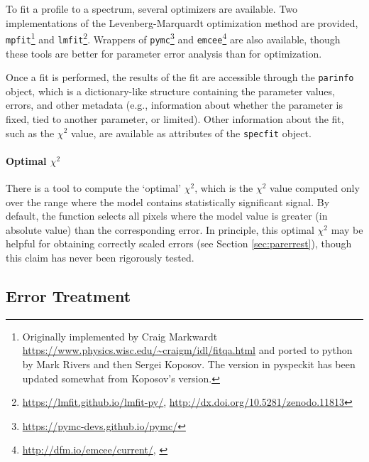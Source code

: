 \documentclass[twocolumn]{aastex61}
\begin{document}
To fit a profile to a spectrum, several optimizers are available.  Two
implementations of the Levenberg-Marquardt optimization method
\citep{Levenberg1944a,Marquardt1963a} are provided,
\texttt{mpfit}\footnote{Originally implemented by Craig Markwardt
\url{https://www.physics.wisc.edu/~craigm/idl/fitqa.html} and ported to python
by Mark Rivers and then Sergei Koposov.  The version in pyspeckit has been
updated somewhat from Koposov's version.} and
\texttt{lmfit}\footnote{\url{https://lmfit.github.io/lmfit-py/},
\url{http://dx.doi.org/10.5281/zenodo.11813}}.  Wrappers of
\texttt{pymc}\footnote{\url{https://pymc-devs.github.io/pymc/}} and
\texttt{emcee}\footnote{\url{http://dfm.io/emcee/current/},
\citet{Foreman-Mackey2013a}} are also available, though these tools are better
for parameter error analysis than for optimization.

Once a fit is performed, the results of the fit are accessible through the
\texttt{parinfo} object, which is a dictionary-like structure containing
the parameter values, errors, and other metadata (e.g., information about
whether the parameter is fixed, tied to another parameter, or limited).
Other information about the fit, such as the $\chi^2$ value, are available
as attributes of the \texttt{specfit} object.

\paragraph{Optimal $\chi^2$}
There is a tool to compute the `optimal' $\chi^2$, which is the $\chi^2$
value computed only over the range where the model contains statistically
significant signal.  By default, the function selects all pixels where
the model value is greater (in absolute value) than the corresponding error.
In principle, this optimal $\chi^2$ may be helpful for obtaining correctly
scaled errors (see Section \ref{sec:parerrest}), though this claim has never
been rigorously tested.


\subsection{Error Treatment}

\end{document}
